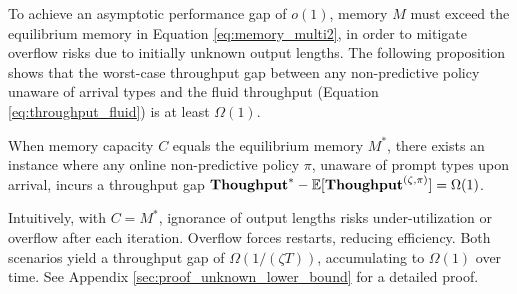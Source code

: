 To achieve an asymptotic performance gap of \( o(1) \), memory \( M \) must exceed the equilibrium memory in Equation \eqref{eq:memory_multi2}, in order to mitigate overflow risks due to initially unknown output lengths. The following proposition shows that the worst-case throughput gap between any non-predictive policy unaware of arrival types and the fluid throughput (Equation \eqref{eq:throughput_fluid}) is at least \( \Omega(1) \).

\begin{proposition}
\label{prop:unknown_lower_bound}
When memory capacity \( C \) equals the equilibrium memory \( M^* \), there exists an instance where any online non-predictive policy \( \pi \), unaware of prompt types upon arrival, incurs a throughput gap \( \textbf{Thoughput}^* - \mathbb{E}[\textbf{Thoughput}^{(\zeta, \pi)}] = \Omega(1) \).
\end{proposition}

Intuitively, with \( C = M^* \), ignorance of output lengths risks under-utilization or overflow after each iteration. Overflow forces restarts, reducing efficiency. Both scenarios yield a throughput gap of \( \Omega(1 / (\zeta T)) \), accumulating to \( \Omega(1) \) over time. See Appendix \ref{sec:proof_unknown_lower_bound} for a detailed proof.



